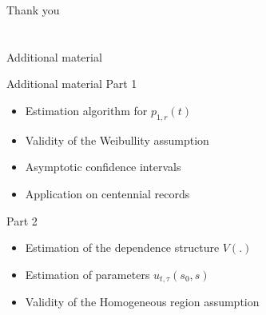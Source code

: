\documentclass[9pt,compress]{beamer}
\begin{document}
%
%
%
{
\begin{frame}
\begin{center}
\LARGE {\color{beamer@blendedblue} Thank you}
\end{center}
\end{frame}}
%
%
%
\section{}
\appendix
\begin{frame}
\begin{center}
\LARGE {\color{beamer@blendedblue} Additional material}
\end{center}
\end{frame}
%
%
%
\appendix
\begin{frame}{Additional material}
Part 1
\begin{itemize}
	\item Estimation algorithm for $p_{1,r}(t)$
	\item Validity of the Weibullity assumption
	\item Asymptotic confidence intervals
	\item Application on centennial records
\end{itemize}
\bigskip

Part 2
\begin{itemize}
	\item Estimation of the dependence structure $V(.)$
	\item Estimation of parameters $u_{t,\tau}(s_0,s)$
	\item Validity of the Homogeneous region assumption
\end{itemize}
\end{frame}
%
%
%
\end{document}
